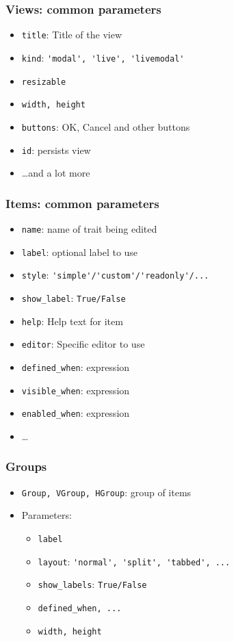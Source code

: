 \documentclass[14pt,compress]{beamer}
\newcommand{\typ}[1]{\lstinline{#1}}
\begin{document}
\begin{frame}[plain]
\frametitle{Views: common parameters}
\begin{itemize}
    \item \typ{title}: Title of the view
    \item \typ{kind}: \typ{'modal', 'live', 'livemodal'}
    \item \typ{resizable}
    \item \typ{width, height}
    \item \typ{buttons}: OK, Cancel and other buttons
    \item \typ{id}: persists view
    \item \ldots and a lot more
\end{itemize}
\end{frame}

\begin{frame}[plain]
\frametitle{Items: common parameters}
\begin{itemize}
    \item \typ{name}: name of trait being edited
    \item \typ{label}: optional label to use
    \item \typ{style}: \typ{'simple'/'custom'/'readonly'/...}
    \item \typ{show_label}: \typ{True/False}
    \item \typ{help}: Help text for item
    \item \typ{editor}: Specific editor to use
    \item \typ{defined_when}: expression
    \item \typ{visible_when}: expression
    \item \typ{enabled_when}: expression
    \item \ldots 
\end{itemize}
\end{frame}

\begin{frame}[plain]
\frametitle{Groups}
\begin{itemize}
    \item \typ{Group, VGroup, HGroup}: group of items
    \item Parameters:
        \begin{itemize}
            \item \typ{label}
            \item \typ{layout}: \typ{'normal', 'split', 'tabbed', ...}
            \item \typ{show_labels}: \typ{True/False}
            \item \typ{defined_when, ...}
            \item \typ{width, height}
        \end{itemize}
\end{itemize}
\end{frame}
\end{document}
